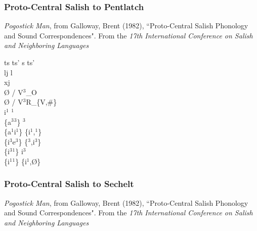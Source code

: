 \documentclass[11pt]{article}
\begin{document}
\subsubsection{Proto-Central Salish to Pentlatch}\textit{Pogostick Man}, from Galloway, Brent (1982), \textquotedblleft Proto-Central Salish Phonology and Sound Correspondences". From the \textit{17th International Conference on Salish and Neighboring Languages}

ts ts' \textrightarrow\hspace{0pt} s ts' \\
l\super j \textrightarrow\hspace{0pt} l \\
x\super j \textrightarrow\hspace{0pt}  \\
 \textrightarrow\hspace{0pt} \O\hspace{0pt} / V$^3$_O \\
 \textrightarrow\hspace{0pt} \O\hspace{0pt} / V$^3$R_\{V,\#\} \\
i$^1$ \textrightarrow\hspace{0pt} $^1$ \\
\{a$^3$\raisebox{-0.7ex}{\textasciitilde}$^3$\} \textrightarrow\hspace{0pt} $^3$ \\
\{a$^1$\raisebox{-0.7ex}{\textasciitilde}i$^1$\} \textrightarrow\hspace{0pt} \{i$^1$,$^1$\} \\
\{i$^3$\raisebox{-0.7ex}{\textasciitilde}e$^3$\} \textrightarrow\hspace{0pt} \{$^3$,i$^3$\} \\
\{i$^3$\raisebox{-0.7ex}{\textasciitilde}$^1$\} \textrightarrow\hspace{0pt} i$^3$ \\
\{i$^1$\raisebox{-0.7ex}{\textasciitilde}$^1$\} \textrightarrow\hspace{0pt} \{i$^1$,\O\} \\

\subsubsection{Proto-Central Salish to Sechelt}\textit{Pogostick Man}, from Galloway, Brent (1982), \textquotedblleft Proto-Central Salish Phonology and Sound Correspondences". From the \textit{17th International Conference on Salish and Neighboring Languages}
\end{document}
